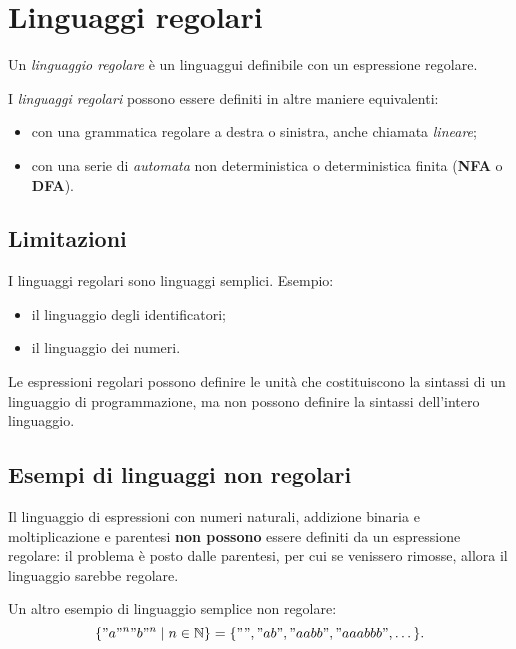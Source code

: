 \section{Linguaggi regolari}
\begin{theorem}
  Un \emph{linguaggio regolare} è un linguaggui definibile con un espressione
  regolare.

  I \emph{linguaggi regolari} possono essere definiti in altre maniere
  equivalenti:
  \begin{itemize}
    \item con una grammatica regolare a destra o sinistra, anche chiamata
      \emph{lineare};
    \item con una serie di \emph{automata} non deterministica o deterministica
      finita (\textbf{NFA} o \textbf{DFA}).
  \end{itemize}
\end{theorem}
\subsection{Limitazioni}
I linguaggi regolari sono linguaggi semplici. Esempio:
\begin{itemize}
  \item il linguaggio degli identificatori;
  \item il linguaggio dei numeri.
\end{itemize}

Le espressioni regolari possono definire le unità che costituiscono la
sintassi di un linguaggio di programmazione, ma non possono definire la
sintassi dell'intero linguaggio.

\subsection{Esempi di linguaggi non regolari}
Il linguaggio di espressioni con numeri naturali, addizione binaria e
moltiplicazione e parentesi \textbf{non possono} essere definiti da un
espressione regolare:
il  problema è posto dalle parentesi, per cui se venissero rimosse, allora il
linguaggio sarebbe regolare.

Un altro esempio di linguaggio semplice non regolare:
\[
  \{"a"^n"b"^n\mid n\in\mathbb{N}\}=\{"","ab","aabb","aaabbb",\dots\}.
\]
